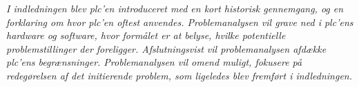 \textit{I indledningen blev \gls{plc}'en introduceret med en kort historisk gennemgang, og en forklaring om hvor \gls{plc}'en oftest anvendes. Problemanalysen vil grave ned i \gls{plc}'ens hardware og software, hvor formålet er at belyse, hvilke potentielle problemstillinger der foreligger. Afslutningsvist vil problemanalysen afdække \gls{plc}'ens begrænsninger. Problemanalysen vil omend muligt, fokusere på redegørelsen af det initierende problem, som ligeledes blev fremført i indledningen.}


